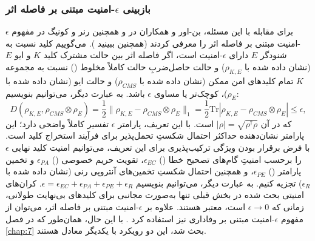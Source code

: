 \subsubsection{بازبینی $\epsilon$-امنیت مبتنی بر فاصله اثر}
\label{subsec:8-2-1-1}
برای مقابله با این مسئله، بن-اور و همکاران در \cite{8-25} و همچنین رنر و کونیگ در \cite{8-27} مفهوم $\epsilon$-امنیت مبتنی بر فاصله اثر را معرفی کردند (همچنین ببینید \cite{8-28, 8-30, 8-31, 8-32, 8-33}). می‌گوییم کلید نسبت به شنودگر $E$ دارای $\epsilon$-امنیت است، اگر فاصله اثر بین حالت مشترک کلید $K$ و ایو $E$ (نشان داده شده با $\rho_{K,E}$) و حالت حاصل‌ضربِ حالت کاملاً مخلوط () نسبت به مجموعه $K$ تمام کلیدهای امن ممکن (نشان داده شده با $\rho_{CMS}$) و حالت ایو (نشان داده شده با $\rho_E$)، کوچک‌تر یا مساوی $\epsilon$ باشد. به عبارت دیگر، می‌توانیم بنویسیم:
\begin{equation}
	D(\rho_{K,E}, \rho_{CMS} \otimes \rho_E) = \frac{1}{2} \|\rho_{K,E} - \rho_{CMS} \otimes \rho_E\|_1 = \frac{1}{2} \text{Tr} |\rho_{K,E} - \rho_{CMS} \otimes \rho_E| \leq \epsilon,
	\label{eq:8-19}
\end{equation}
که در آن $|\rho| = \sqrt{\rho^\dagger \rho}$ است. با این تعریف، پارامتر $\epsilon$ تفسیر کاملاً واضحی دارد؛ این پارامتر نشان‌دهنده حداکثر احتمال شکستِ تحمل‌پذیر برای فرآیند استخراج کلید است. با فرض برقرار بودن ویژگی ترکیب‌پذیری برای این تعریف، می‌توانیم امنیت کلید نهایی $\epsilon$ را برحسب امنیتِ گام‌های تصحیح خطا () $\epsilon_{EC}$، تقویت حریم خصوصی () $\epsilon_{PA}$ و تخمین پارامتر () $\epsilon_{PE}$، و همچنین احتمال شکستِ تخمین‌های آنتروپی رنی \cite{8-25} (نشان داده شده با $\epsilon_R$) تجزیه کنیم. به عبارت دیگر، می‌توانیم بنویسیم $\epsilon = \epsilon_{EC} + \epsilon_{PA} + \epsilon_{PE} + \epsilon_R$. کران‌های امنیتی بحث شده در بخش قبلی تنها به‌صورت مجانبی برای کلیدهای بی‌نهایت طولانی، زمانی که $\epsilon \to 0$ است، معتبر هستند. علاوه بر $\epsilon$-امنیت مبتنی بر فاصله اثر، می‌توان از مفهوم $\epsilon$-امنیت مبتنی بر وفاداری نیز استفاده کرد \cite{8-25}. با این حال، همان‌طور که در فصل \ref{chap:7} بحث شد، این دو رویکرد با یکدیگر معادل هستند.

